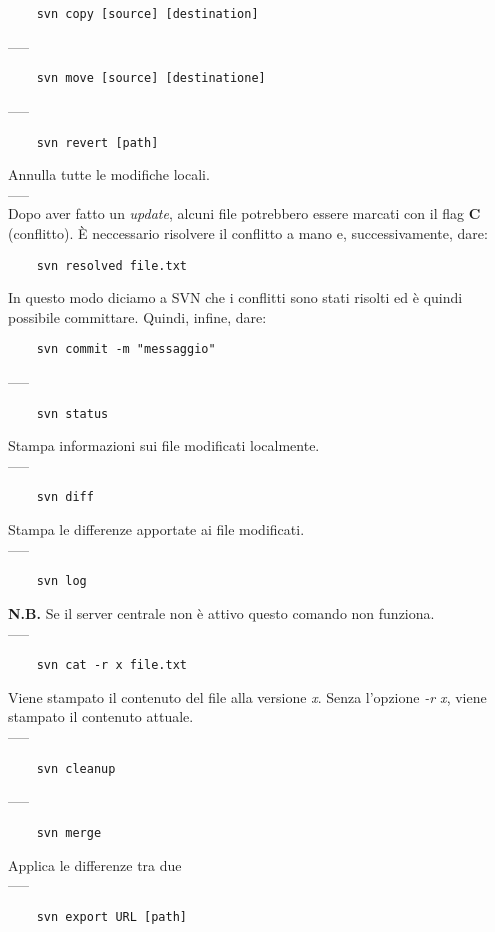 \documentclass[a4paper]{article}
\begin{document}
	\begin{verbatim}
	svn copy [source] [destination]
	\end{verbatim}
	-----
	\begin{verbatim}
	svn move [source] [destinatione]
	\end{verbatim}
	-----
	\begin{verbatim}
	svn revert [path]
	\end{verbatim}
	Annulla tutte le modifiche locali.\\-----\\
	Dopo aver fatto un \textit{update}, alcuni file potrebbero essere marcati con il flag \textbf{C} (conflitto). È neccessario risolvere il conflitto a mano e, successivamente, dare:
	\begin{verbatim}
	svn resolved file.txt
	\end{verbatim}
	In questo modo diciamo a SVN che i conflitti sono stati risolti ed è quindi possibile committare. Quindi, infine, dare:
	\begin{verbatim}
	svn commit -m "messaggio"
	\end{verbatim}
	-----\\
	\begin{verbatim}
	svn status
	\end{verbatim}
	Stampa informazioni sui file modificati localmente.
	\\-----
	\begin{verbatim}
	svn diff
	\end{verbatim}
	Stampa le differenze apportate ai file modificati.\\-----
	\begin{verbatim}
	svn log
	\end{verbatim}
	\textbf{N.B.} Se il server centrale non è attivo questo comando non funziona.
	\\-----
	\begin{verbatim}
	svn cat -r x file.txt 
	\end{verbatim}
	Viene stampato il contenuto del file alla versione \textit{x}. Senza l'opzione \textit{-r x}, viene stampato il contenuto attuale.\\-----
	\begin{verbatim}
	svn cleanup
	\end{verbatim}
	-----
	\begin{verbatim}
	svn merge
	\end{verbatim}
	Applica le differenze tra due\\-----
	\begin{verbatim}
	svn export URL [path]
	\end{verbatim}
\end{document}
